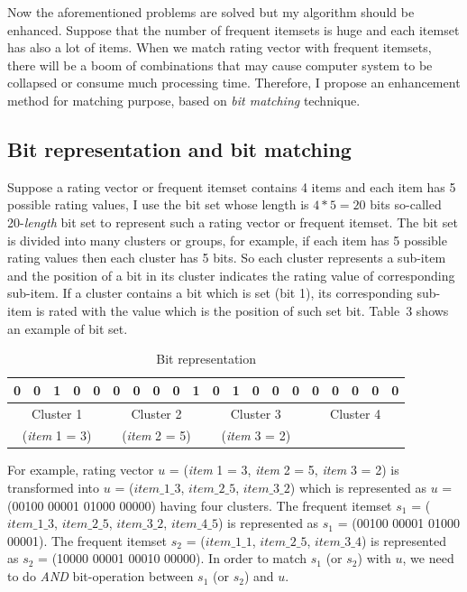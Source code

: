 \documentclass{sig-alternate}
\begin{document}
Now the aforementioned problems are solved but my algorithm should be enhanced. Suppose that the number of frequent itemsets is huge and each itemset has also a lot of items. When we match rating vector with frequent itemsets, there will be a boom of combinations that may cause computer system to be collapsed or consume much processing time. Therefore, I propose an enhancement method for matching purpose, based on \textit{bit matching} technique.

\subsection{Bit representation and bit matching}
Suppose a rating vector or frequent itemset contains 4 items and each item has 5 possible rating values, I use the bit set whose length is $4 * 5 = 20$ bits so-called 20-\textit{length} bit set to represent such a rating vector or frequent itemset. The bit set is divided into many clusters or groups, for example, if each item has 5 possible rating values then each cluster has 5 bits. So each cluster represents a sub-item and the position of a bit in its cluster indicates the rating value of corresponding sub-item. If a cluster contains a bit which is set (bit 1), its corresponding sub-item is rated with the value which is the position of such set bit. Table~3 shows an example of bit set.
\begin{table} \label{table:bit.representation}
\setlength{\tabcolsep}{3.5pt}
\centering
\caption{Bit representation}
\begin{tabular}{|c|c|c|c|c|c|c|c|c|c|c|c|c|c|c|c|c|c|c|c|} \hline
0&0&1&0&0&0&0&0&0&1&0&1&0&0&0&0&0&0&0&0\\ \hline
\multicolumn{5}{|c|}{Cluster 1}&\multicolumn{5}{|c|}{Cluster 2}&\multicolumn{5}{|c|}{Cluster 3}&\multicolumn{5}{|c|}{Cluster 4}\\
\multicolumn{5}{|c|}{(\textit{item} 1 = 3)}&\multicolumn{5}{|c|}{(\textit{item} 2 = 5)}&\multicolumn{5}{|c|}{(\textit{item} 3 = 2)}&\multicolumn{5}{|c|}{}\\ \hline
\end{tabular}
\end{table}
For example, rating vector $u$ = (\textit{item} 1 = 3, \textit{item} 2 = 5, \textit{item} 3 = 2) is transformed into $u$ = ($item\_1\_3$, $item\_2\_5$, $item\_3\_2$) which is represented as $u$ = (00100 00001 01000 00000) having four clusters. The frequent itemset $s_1$ = ($item\_1\_3$, $item\_2\_5$, $item\_3\_2$, $item\_4\_5$) is represented as $s_1$ = (00100 00001 01000 00001). The frequent itemset $s_2$ = ($item\_1\_1$, $item\_2\_5$, $item\_3\_4$) is represented as $s_2$ = (10000 00001 00010 00000). In order to match $s_1$ (or $s_2$) with $u$, we need to do \textit{AND} bit-operation between $s_1$ (or $s_2$) and $u$.
\end{document}

